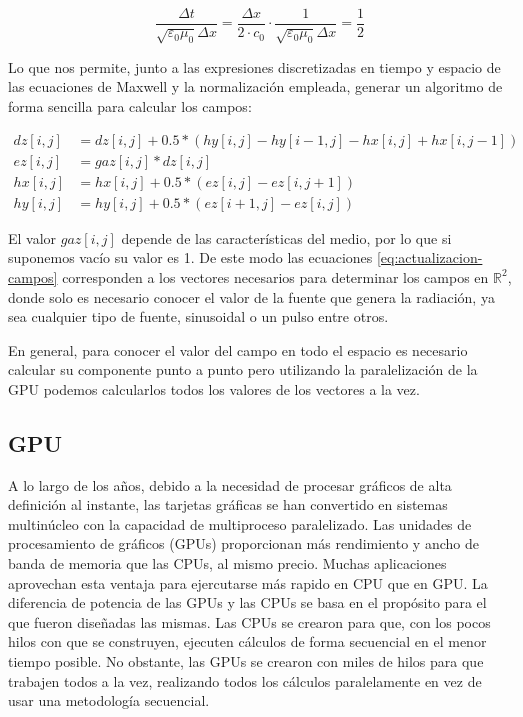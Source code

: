 \documentclass[11pt,a4paper,twoside,pdf]{article}
\numberwithin{equation}{section}
\begin{document}
\begin{equation}
    \frac{\Delta t}{\sqrt{\varepsilon_{0} \mu_{0}} \Delta x}=\frac{\Delta x}{2 \cdot c_{0}}\cdot 
     \frac{1}{\sqrt{\varepsilon_{0} \mu_{0}} \Delta x}=\frac{1}{2}
\end{equation}

Lo que nos permite, junto a las expresiones discretizadas en tiempo y espacio de las ecuaciones de Maxwell y la normalización empleada, generar un algoritmo de forma sencilla para calcular los campos:

\begin{align} \label{eq:actualizacion-campos}
	dz[i,j] &=dz[i,j] + 0.5*(hy[i,j]-hy[i-1,j]-hx[i,j]+hx[i,j-1]) \nonumber \\
    ez[i,j] &=gaz[i,j]*dz[i,j]  \nonumber \\
    hx[i,j] &=hx[i,j]+0.5*(ez[i,j]-ez[i,j+1]) \nonumber \\
    hy[i,j] &=hy[i,j]+0.5*(ez[i+1,j]-ez[i,j]) 
\end{align}

El valor $gaz[i,j]$ depende de las características del medio, por lo que si suponemos vacío su valor es 1. De este modo las ecuaciones \eqref{eq:actualizacion-campos} corresponden a los vectores necesarios para determinar los campos en $\mathbb R^{2}$, donde solo es necesario conocer el valor de la fuente que genera la radiación, ya sea cualquier tipo de fuente, sinusoidal o un pulso entre otros. 

En general, para conocer el valor del campo en todo el espacio es necesario calcular  su componente punto a punto pero utilizando la paralelización de la GPU podemos calcularlos todos los valores de los vectores a la vez.


\subsection{GPU} \label{sec:gpu}

A lo largo de los años, debido a la necesidad de procesar gráficos de alta definición al instante, las tarjetas gráficas se han convertido en sistemas multinúcleo con la capacidad de multiproceso paralelizado. Las unidades de procesamiento de gráficos (GPUs) proporcionan más rendimiento y ancho de banda de memoria que las CPUs, al mismo precio. Muchas aplicaciones aprovechan esta ventaja para ejercutarse más rapido en CPU que en GPU. La diferencia de potencia de las GPUs y las CPUs se basa en el propósito para el que fueron diseñadas las mismas. Las CPUs se crearon para que, con los pocos hilos con que se construyen, ejecuten cálculos de forma secuencial en el menor tiempo posible. No obstante, las GPUs se crearon con miles de hilos para que trabajen todos a la vez, realizando todos los cálculos paralelamente en vez de usar una metodología secuencial.
\end{document}
